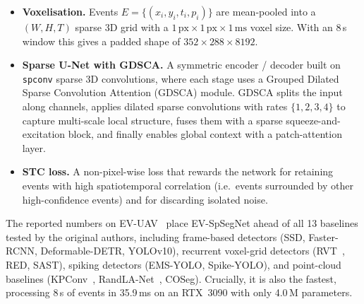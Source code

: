 \documentclass[11pt,a4paper]{article}
\begin{document}
\begin{itemize}
\setlength\itemsep{0.2em}
  \item \textbf{Voxelisation.} Events $E = \{(x_i, y_i, t_i, p_i)\}$
        are mean-pooled into a $(W, H, T)$ sparse 3D grid with a
        $1\,\text{px} \times 1\,\text{px} \times 1\,\text{ms}$ voxel
        size. With an 8\,s window this gives a padded shape of
        $352 \times 288 \times 8192$.
  \item \textbf{Sparse U-Net with GDSCA.} A symmetric encoder /
        decoder built on \texttt{spconv} sparse 3D convolutions, where
        each stage uses a Grouped Dilated Sparse Convolution Attention
        (GDSCA) module. GDSCA splits the input along channels, applies
        dilated sparse convolutions with rates $\{1,2,3,4\}$ to capture
        multi-scale local structure, fuses them with a sparse
        squeeze-and-excitation block, and finally enables global
        context with a patch-attention layer.
  \item \textbf{STC loss.} A non-pixel-wise loss that rewards the
        network for retaining events with high spatiotemporal
        correlation (i.e.\ events surrounded by other high-confidence
        events) and for discarding isolated noise.
\end{itemize}

The reported numbers on EV-UAV~\cite{chen2025evspsegnet} place
EV-SpSegNet ahead of all 13 baselines tested by the original authors,
including frame-based detectors (SSD, Faster-RCNN, Deformable-DETR,
YOLOv10), recurrent voxel-grid detectors
(RVT~\cite{gehrig2023rvt}, RED, SAST), spiking detectors (EMS-YOLO,
Spike-YOLO), and point-cloud baselines
(KPConv~\cite{thomas2019kpconv}, RandLA-Net~\cite{hu2020randla},
COSeg). Crucially, it is also the fastest, processing 8\,s of
events in 35.9\,ms on an RTX~3090 with only 4.0\,M parameters.
\end{document}

